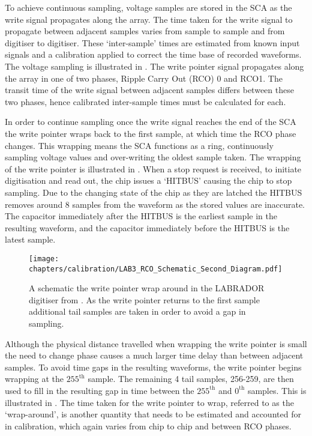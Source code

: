 To achieve continuous sampling, voltage samples are stored in the SCA as the write signal propagates along the array. The time taken for the write signal to propagate between adjacent samples varies from sample to sample and from digitiser to digitiser. These `inter-sample' times are estimated from known input signals and a calibration applied to correct the time base of recorded waveforms. The voltage sampling is illustrated in . The write pointer signal propagates along the array in one of two phases, Ripple Carry Out (RCO) 0 and RCO1. The transit time of the write signal between adjacent samples differs between these two phases, hence calibrated inter-sample times must be calculated for each.

In order to continue sampling once the write signal reaches the end of the SCA the write pointer wraps back to the first sample, at which time the RCO phase changes. This wrapping means the SCA functions as a ring, continuously sampling voltage values and over-writing the oldest sample taken. The wrapping of the write pointer is illustrated in . When a stop request is received, to initiate digitisation and read out, the chip issues a `HITBUS' causing the chip to stop sampling. Due to the changing state of the chip as they are latched the HITBUS removes around 8 samples from the waveform as the stored values are inaccurate. The capacitor immediately after the HITBUS is the earliest sample in the resulting waveform, and the capacitor immediately before the HITBUS is the latest sample. 

\begin{figure}[htpb]
  \texttt{[image: chapters/calibration/LAB3\_RCO\_Schematic\_Second\_Diagram.pdf]}
  \caption{A schematic the write pointer wrap around in the LABRADOR digitiser from \cite{Varner2007447}. As the write pointer returns to the first sample additional tail samples are taken in order to avoid a gap in sampling.}
  \label{fig:calibration:LABRADOR-Digitiser-Chip:RCO-Schematic}
\end{figure}


Although the physical distance travelled when wrapping the write pointer is small the need to change phase causes a much larger time delay than between adjacent samples. To avoid time gaps in the resulting waveforms, the write pointer begins wrapping at the $255^{\mbox{th}}$ sample. The remaining 4 tail samples, 256-259, are then used to fill in the resulting gap in time between the $255^{\mbox{th}}$ and $0^{\mbox{th}}$ samples. This is illustrated in .  The time taken for the write pointer to wrap, referred to as the `wrap-around', is another quantity that needs to be estimated and accounted for in calibration, which again varies from chip to chip and between RCO phases.


